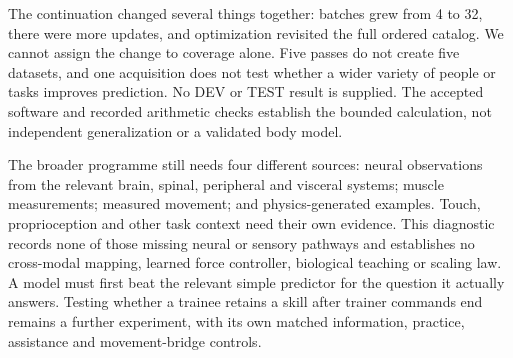 The continuation changed several things together: batches grew from 4 to 32, there were more updates, and optimization revisited the full ordered catalog. We cannot assign the change to coverage alone. Five passes do not create five datasets, and one acquisition does not test whether a wider variety of people or tasks improves prediction. No DEV or TEST result is supplied. The accepted software and recorded arithmetic checks establish the bounded calculation, not independent generalization or a validated body model.

The broader programme still needs four different sources: neural observations from the relevant brain, spinal, peripheral and visceral systems; muscle measurements; measured movement; and physics-generated examples. Touch, proprioception and other task context need their own evidence. This diagnostic records none of those missing neural or sensory pathways and establishes no cross-modal mapping, learned force controller, biological teaching or scaling law. A model must first beat the relevant simple predictor for the question it actually answers. Testing whether a trainee retains a skill after trainer commands end remains a further experiment, with its own matched information, practice, assistance and movement-bridge controls.
